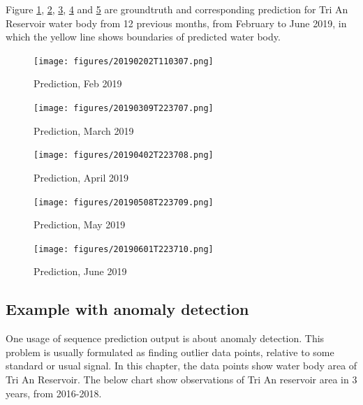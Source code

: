 Figure \ref{fig:prediction_02}, \ref{fig:prediction_03}, \ref{fig:prediction_04}, \ref{fig:prediction_05} and \ref{fig:prediction_06} are groundtruth and corresponding prediction for Tri An Reservoir water body from 12 previous months, from February to June 2019, in which the yellow line shows boundaries of predicted water body.

\begin{figure}[h!]
	\centering
	\texttt{[image: figures/20190202T110307.png]}
	\caption[]{Prediction, Feb 2019}
	\label{fig:prediction_02}
\end{figure}

\begin{figure}[h!]
	\centering
	\texttt{[image: figures/20190309T223707.png]}
	\caption[]{Prediction, March 2019}
		\label{fig:prediction_03}
\end{figure}

\begin{figure}[h!]
	\centering
	\texttt{[image: figures/20190402T223708.png]}
	\caption[]{Prediction, April 2019}
		\label{fig:prediction_04}
\end{figure}

\begin{figure}[h!]
	\centering
	\texttt{[image: figures/20190508T223709.png]}
	\caption[]{Prediction, May 2019}
		\label{fig:prediction_05}
\end{figure}

\begin{figure}[h!]
	\centering
	\texttt{[image: figures/20190601T223710.png]}
	\caption[]{Prediction, June 2019}
		\label{fig:prediction_06}
\end{figure}


\subsection{Example with anomaly detection}
\label{section:anomalyDetection}

One usage of sequence prediction output is about anomaly detection. This problem is usually formulated as finding outlier data points, relative to some standard or usual signal. In this chapter, the data points show water body area of Tri An Reservoir. The below chart show observations of Tri An reservoir area in 3 years, from 2016-2018.


